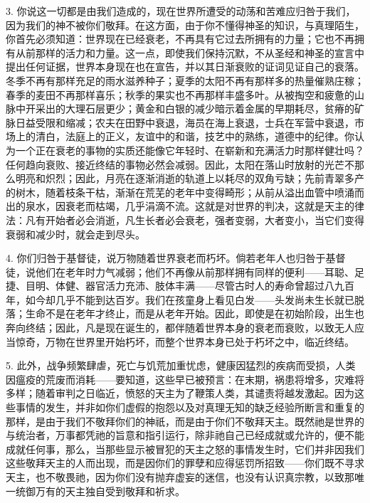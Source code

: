 3. 你说这一切都是由我们造成的，现在世界所遭受的动荡和苦难应归咎于我们，因为我们的神不被你们敬拜。在这方面，由于你不懂得神圣的知识，与真理陌生，你首先必须知道：世界现在已经衰老，不再具有它过去所拥有的力量；它也不再拥有从前那样的活力和力量。这一点，即使我们保持沉默，不从圣经和神圣的宣言中提出任何证据，世界本身现在也在宣告，并以其日渐衰败的证词见证自己的衰落。冬季不再有那样充足的雨水滋养种子；夏季的太阳不再有那样多的热量催熟庄稼；春季的麦田不再那样喜乐；秋季的果实也不再那样丰盛多叶。从被掏空和疲惫的山脉中开采出的大理石层更少；黄金和白银的减少暗示着金属的早期耗尽，贫瘠的矿脉日益受限和缩减；农夫在田野中衰退，海员在海上衰退，士兵在军营中衰退，市场上的清白，法庭上的正义，友谊中的和谐，技艺中的熟练，道德中的纪律。你认为一个正在衰老的事物的实质还能像它年轻时、在崭新和充满活力时那样健壮吗？任何趋向衰败、接近终结的事物必然会减弱。因此，太阳在落山时放射的光芒不那么明亮和炽烈；因此，月亮在逐渐消逝的轨道上以耗尽的双角亏缺；先前青翠多产的树木，随着枝条干枯，渐渐在荒芜的老年中变得畸形；从前从溢出血管中喷涌而出的泉水，因衰老而枯竭，几乎涓滴不流。这就是对世界的判决，这就是天主的律法：凡有开始者必会消逝，凡生长者必会衰老，强者变弱，大者变小，当它们变得衰弱和减少时，就会走到尽头。\par

4. 你们归咎于基督徒，说万物随着世界衰老而朽坏。倘若老年人也归咎于基督徒，说他们在老年时力气减弱；他们不再像从前那样拥有同样的便利——耳聪、足捷、目明、体健、器官活力充沛、肢体丰满——尽管古时人的寿命曾超过八九百年，如今却几乎不能到达百岁。我们在孩童身上看见白发——头发尚未生长就已脱落；生命不是在老年才终止，而是从老年开始。因此，即使是在初始阶段，出生也奔向终结；因此，凡是现在诞生的，都伴随着世界本身的衰老而衰败，以致无人应当惊奇，万物在世界里开始朽坏，而整个世界本身已处于朽坏之中，临近终结。\par

5. 此外，战争频繁肆虐，死亡与饥荒加重忧虑，健康因猛烈的疾病而受损，人类因瘟疫的荒废而消耗——要知道，这些早已被预言：在末期，祸患将增多，灾难将多样；随着审判之日临近，愤怒的天主为了鞭策人类，其谴责将越发激起。因为这些事情的发生，并非如你们虚假的抱怨以及对真理无知的缺乏经验所断言和重复的那样，是由于我们不敬拜你们的神祇，而是由于你们不敬拜天主。既然祂是世界的与统治者，万事都凭祂的旨意和指引运行，除非祂自己已经成就或允许的，便不能成就任何事，那么，当那些显示被冒犯的天主之怒的事情发生时，它们并非因我们这些敬拜天主的人而出现，而是因你们的罪孽和应得惩罚所招致——你们既不寻求天主，也不敬畏祂，因为你们没有抛弃虚妄的迷信，也没有认识真宗教，以致那唯一统御万有的天主独自受到敬拜和祈求。\par

